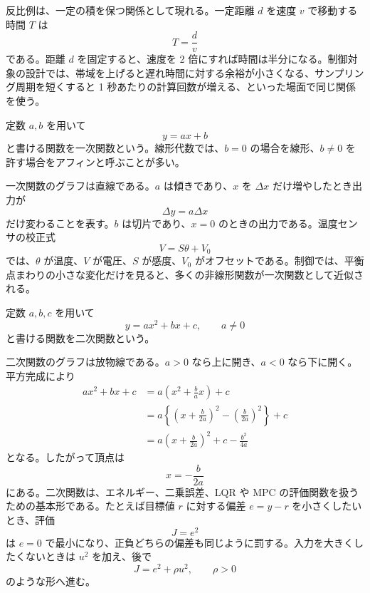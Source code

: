 反比例は、一定の積を保つ関係として現れる。一定距離 $d$ を速度 $v$ で移動する時間 $T$ は
\begin{equation}
  T=\frac{d}{v}
\end{equation}
である。距離 $d$ を固定すると、速度を 2 倍にすれば時間は半分になる。制御対象の設計では、帯域を上げると遅れ時間に対する余裕が小さくなる、サンプリング周期を短くすると 1 秒あたりの計算回数が増える、といった場面で同じ関係を使う。

\begin{definition}[一次関数とアフィン関数]
定数 $a,b$ を用いて
\begin{equation}
  y=ax+b
\end{equation}
と書ける関数を一次関数という。線形代数では、$b=0$ の場合を線形、$b\ne0$ を許す場合をアフィンと呼ぶことが多い。
\end{definition}

一次関数のグラフは直線である。$a$ は傾きであり、$x$ を $\Delta x$ だけ増やしたとき出力が
\begin{equation}
  \Delta y=a\Delta x
\end{equation}
だけ変わることを表す。$b$ は切片であり、$x=0$ のときの出力である。温度センサの校正式
\begin{equation}
  V=S\theta+V_0
\end{equation}
では、$\theta$ が温度、$V$ が電圧、$S$ が感度、$V_0$ がオフセットである。制御では、平衡点まわりの小さな変化だけを見ると、多くの非線形関数が一次関数として近似される。

\begin{definition}[二次関数]
定数 $a,b,c$ を用いて
\begin{equation}
  y=ax^2+bx+c,\qquad a\ne0
\end{equation}
と書ける関数を二次関数という。
\end{definition}

二次関数のグラフは放物線である。$a>0$ なら上に開き、$a<0$ なら下に開く。平方完成により
\begin{align}
  ax^2+bx+c
  &=a\left(x^2+\frac{b}{a}x\right)+c\\
  &=a\left\{\left(x+\frac{b}{2a}\right)^2
    -\left(\frac{b}{2a}\right)^2\right\}+c\\
  &=a\left(x+\frac{b}{2a}\right)^2
    +c-\frac{b^2}{4a}
\end{align}
となる。したがって頂点は
\begin{equation}
  x=-\frac{b}{2a}
\end{equation}
にある。二次関数は、エネルギー、二乗誤差、LQR や MPC の評価関数を扱うための基本形である。たとえば目標値 $r$ に対する偏差 $e=y-r$ を小さくしたいとき、評価
\begin{equation}
  J=e^2
\end{equation}
は $e=0$ で最小になり、正負どちらの偏差も同じように罰する。入力を大きくしたくないときは $u^2$ を加え、後で
\begin{equation}
  J=e^2+\rho u^2,\qquad \rho>0
\end{equation}
のような形へ進む。

